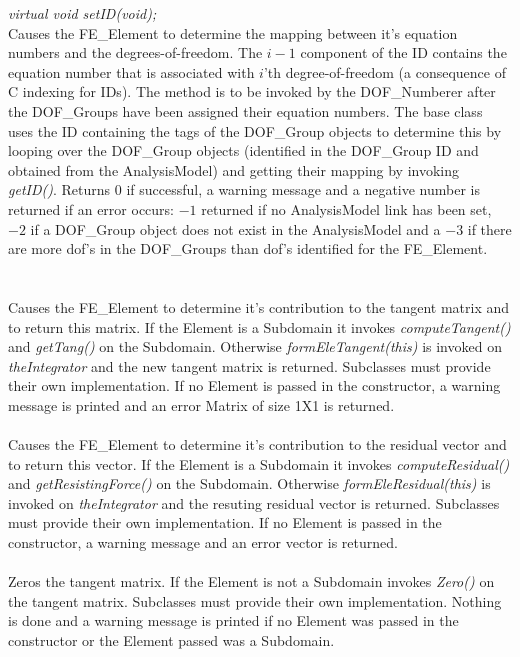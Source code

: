 {\em virtual void setID(void);} \\
Causes the FE\_Element to determine the mapping between it's equation
numbers and the degrees-of-freedom. The $i-1$ component of the ID
contains the equation number that is associated with $i$'th
degree-of-freedom (a consequence of C indexing for IDs). The method is
to be invoked by the DOF\_Numberer after the DOF\_Groups have been assigned
their equation numbers. The base class uses the ID containing the tags of
the DOF\_Group objects to determine this by looping over the
DOF\_Group objects (identified in the DOF\_Group ID and obtained from
the AnalysisModel) and getting their mapping by invoking {\em
getID()}. Returns $0$ if successful, a warning message and a
negative number is returned if an error occurs:
$-1$ returned if no AnalysisModel link has been set, $-2$ if a
DOF\_Group object does not exist in the AnalysisModel and a $-3$ if
there are more dof's in the DOF\_Groups than dof's identified for the
FE\_Element. \\


  \\
 \\ 
Causes the FE\_Element to determine it's contribution to the tangent
matrix and to return this matrix. If the Element is a
Subdomain it invokes {\em computeTangent()} and {\em getTang()} on the
Subdomain. Otherwise {\em formEleTangent(this)} is invoked on {\em
theIntegrator} and the new tangent matrix is returned.
Subclasses must provide their own implementation. If no Element is
passed in the constructor, a warning message is
printed and an error Matrix of size 1X1 is returned. \\


 \\
Causes the FE\_Element to determine it's contribution to the residual
vector and to return this vector. If the Element is a Subdomain it invokes
{\em computeResidual()} and {\em getResistingForce()} on the Subdomain.
Otherwise {\em formEleResidual(this)} is invoked on {\em theIntegrator}
and the resuting residual vector is returned. 
Subclasses must provide their own implementation. If no Element is
passed in the constructor, a warning message and an error vector is
returned. \\


 \\
Zeros the tangent matrix. If the Element is not a Subdomain invokes
{\em Zero()} on the tangent matrix. Subclasses must provide their own
implementation. Nothing is done and a warning message is printed if no
Element was passed in the constructor or the Element passed was a
Subdomain. \\ 


